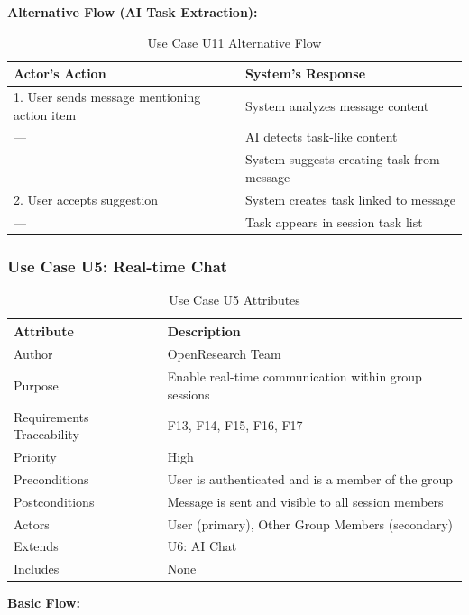 \documentclass[11pt,a4paper]{article}
\begin{document}
\textbf{Alternative Flow (AI Task Extraction):}

\begin{table}[H]
\centering
\begin{tabular}{p{6cm}p{7cm}}
\toprule
\textbf{Actor's Action} & \textbf{System's Response} \\
\midrule
1. User sends message mentioning action item & System analyzes message content \\
--- & AI detects task-like content \\
--- & System suggests creating task from message \\
2. User accepts suggestion & System creates task linked to message \\
--- & Task appears in session task list \\
\bottomrule
\end{tabular}
\caption{Use Case U11 Alternative Flow}
\end{table}

\subsubsection{Use Case U5: Real-time Chat}

\begin{table}[H]
\centering
\begin{tabular}{p{4cm}p{9cm}}
\toprule
\textbf{Attribute} & \textbf{Description} \\
\midrule
Author & OpenResearch Team \\
Purpose & Enable real-time communication within group sessions \\
Requirements Traceability & F13, F14, F15, F16, F17 \\
Priority & High \\
Preconditions & User is authenticated and is a member of the group \\
Postconditions & Message is sent and visible to all session members \\
Actors & User (primary), Other Group Members (secondary) \\
Extends & U6: AI Chat \\
Includes & None \\
\bottomrule
\end{tabular}
\caption{Use Case U5 Attributes}
\end{table}

\textbf{Basic Flow:}
\end{document}
